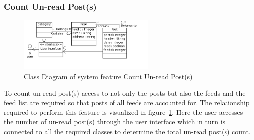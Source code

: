 \newpage
\subsubsection{Count Un-read Post(s)}
\begin{figure}[hbt]
\centering
\includegraphics[width=0.6\textwidth]
{./images/CountUnreadPosts.png}
\caption{Class Diagram of system feature Count Un-read Post(s)}
\label{fig:count}
\end{figure}
To count un-read post(s) access to not only the posts but also the feeds and the feed list are required so that posts of all feeds are accounted for. The relationship required to perform this feature is visualized in figure~\ref{fig:count}. Here the user accesses the number of un-read post(s) through the user interface which in turn is connected to all the required classes to determine the total un-read post(s) count. \\

